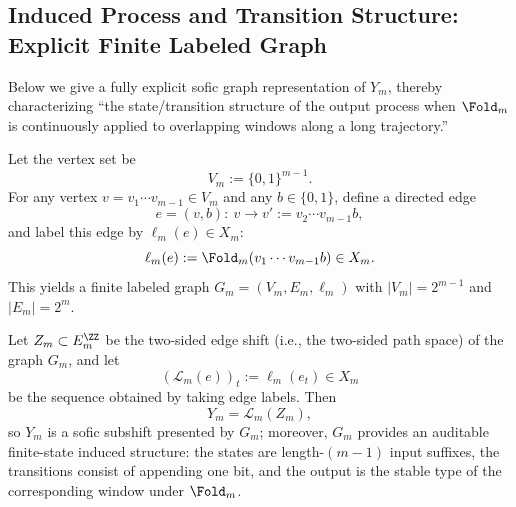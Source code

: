 \subsection{Induced Process and Transition Structure: Explicit Finite Labeled Graph}\label{subsec:Phi_m-graph}

Below we give a fully explicit sofic graph representation of $Y_m$, thereby characterizing ``the state/transition structure of the output process when $\Fold_m$ is continuously applied to overlapping windows along a long trajectory.''

\begin{definition}\label{def:G_m}
Let the vertex set be
\[
V_m:=\{0,1\}^{m-1}.
\]
For any vertex $v=v_1\cdots v_{m-1}\in V_m$ and any $b\in\{0,1\}$, define a directed edge
\[
e=(v,b):\ v\to v':=v_2\cdots v_{m-1}b,
\]
and label this edge by $\ell_m(e)\in X_m$:
\[
\ell_m(e):=\Fold_m(v_1\cdots v_{m-1}b)\in X_m.
\]
This yields a finite labeled graph $G_m=(V_m,E_m,\ell_m)$ with $|V_m|=2^{m-1}$ and $|E_m|=2^{m}$.
\end{definition}

\begin{theorem}\label{thm:Phi_m-sofic-graph}
Let $Z_m\subset E_m^{\ZZ}$ be the two-sided edge shift (i.e., the two-sided path space) of the graph $G_m$, and let
\[
(\mathcal{L}_m(e))_t:=\ell_m(e_t)\in X_m
\]
be the sequence obtained by taking edge labels. Then
\[
Y_m=\mathcal{L}_m(Z_m),
\]
so $Y_m$ is a sofic subshift presented by $G_m$; moreover, $G_m$ provides an auditable finite-state induced structure: the states are length-$(m-1)$ input suffixes, the transitions consist of appending one bit, and the output is the stable type of the corresponding window under $\Fold_m$.
\end{theorem}

